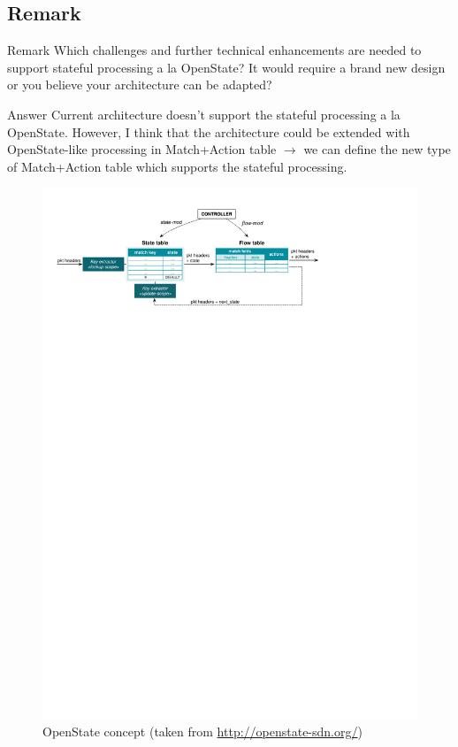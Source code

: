 \subsection{Remark \theRemarkCounter}
\begin{frame}[allowframebreaks]
    \begin{block}{Remark \theRemarkCounter}
         Which challenges and further technical enhancements
         are needed to support stateful processing a la OpenState? It would require a brand new
         design or you believe your architecture can be adapted?        
    \end{block}
    
    \begin{exampleblock}{Answer}
        Current architecture doesn't support the stateful processing a la OpenState. 
        However, I think that the architecture could be extended with OpenState-like processing in Match+Action table 
        $\rightarrow$ we can define the new type of Match+Action table which supports the stateful processing.
    \end{exampleblock}
    
    \pagebreak
    
    \begin{figure}
        \includegraphics[width=\textwidth]{pic/OpenStateConcept}
        \caption{OpenState concept (taken from \url{http://openstate-sdn.org/})}
    \end{figure}
\end{frame}

